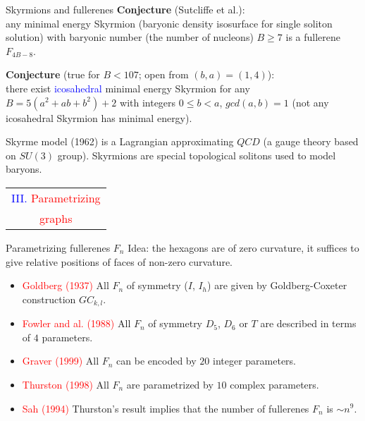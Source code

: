 \documentclass[%
pdf,
colorBG,
slideColor,
]{prosper}
\begin{document}
\begin{slide}{Skyrmions and fullerenes}
{\bf Conjecture} (Sutcliffe et al.):\\
any minimal energy Skyrmion (baryonic density isosurface for
single soliton solution) with baryonic number (the number of nucleons)
$B \ge 7$ is a fullerene $F_{4B-8}$.

{\bf Conjecture} (true for $B<107$; open from $(b,a)=(1,4)$):\\
there exist \textcolor{blue}{icosahedral} minimal energy Skyrmion for
any $B=5(a^2+ab+b^2)+2$ with integers $0 \le b <a$, $gcd(a,b)=1$
(not any icosahedral Skyrmion has minimal energy).

\vspace{3mm}
Skyrme model (1962) is a Lagrangian approximating $QCD$ (a gauge theory 
based on $SU(3)$ group). Skyrmions are special topological solitons used to 
model baryons.   
\end{slide}



\begin{slide}{}
\begin{center}
{\Huge 
\begin{tabular*}{7cm}{c}
\\[-0.4cm]
\textcolor{blue}{III. }\textcolor{red}{Parametrizing}\\
\textcolor{red}{graphs}
\end{tabular*}
}
\end{center}
\end{slide}




\begin{slide}{Parametrizing fullerenes $F_n$}
Idea: the hexagons are of zero curvature, it suffices to give relative 
positions of faces of non-zero curvature.
\begin{itemize}
\item \textcolor{red}{Goldberg (1937)} All $F_n$ of symmetry
($I$, $I_h$) are given by Goldberg-Coxeter construction $GC_{k,l}$.
\item \textcolor{red}{Fowler and al. (1988)} All $F_n$ of symmetry 
$D_5$, $D_6$ or $T$ are described in terms of $4$ parameters.
\item \textcolor{red}{Graver (1999)} All $F_n$ can be encoded by $20$ 
integer parameters.
\item \textcolor{red}{Thurston (1998)} All $F_n$
are parametrized by $10$ complex parameters.
\item \textcolor{red}{Sah (1994)} Thurston's result implies that the 
number of fullerenes $F_n$ is $\sim n^9$. 
\end{itemize}
\end{slide}
\end{document}
